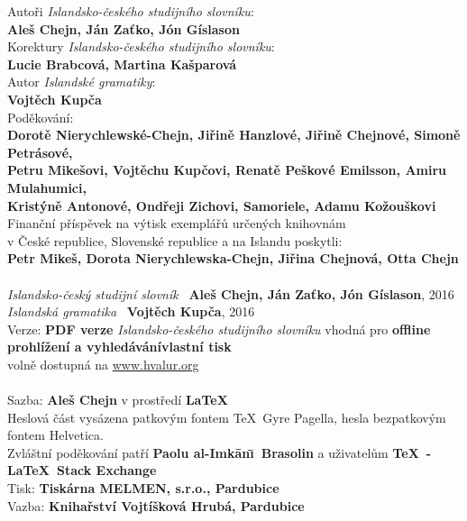 \noindent\begin{minipage}[t][\textheight][t]{\textwidth}
Autoři \textit{Islandsko-českého studijního slovníku}:\\
  \textbf{Aleš Chejn, Ján Zaťko, Jón Gíslason}\\[\baselineskip]
Korektury \textit{Islandsko-českého studijního slovníku}:\\
  \textbf{Lucie Brabcová, Martina Kašparová}\\[\baselineskip]
\ifPDF
\else
Autor \textit{Islandské gramatiky}:\\
  \textbf{Vojtěch Kupča}\\[\baselineskip]
\fi
Poděkování:\\
  \textbf{Dorotě Nierychlewské-Chejn, Jiřině Hanzlové, Jiřině Chejnové,
          Simoně Petrásové,\\ Petru Mikešovi, Vojtěchu Kupčovi, 
          Renatě Peškové Emilsson, Amiru Mulahumici, \\ Kristýně Antonové, 
          Ondřeji Zichovi, Samoriele, Adamu Kožouškovi}\\[\baselineskip]
Finanční příspěvek na výtisk exemplářů určených knihovnám\\ v České republice,
Slovenské republice a na Islandu poskytli:\\
  \textbf{Petr Mikeš, Dorota Nierychlewska-Chejn, Jiřina Chejnová, Otta Chejn}
  \ifPDF
  \\[36\baselineskip]
  \else
  \\[33\baselineskip]
  \fi
\textit{Islandsko-český studijní slovník} \textcopyright\  \textbf{Aleš Chejn, Ján Zaťko, Jón Gíslason}, 2016\\
\textit{Islandská gramatika} \textcopyright\  \textbf{Vojtěch Kupča}, 2016\\[\baselineskip]
\ifPDF
Verze: \textbf{PDF verze} \textit{Islandsko-českého studijního slovníku} vhodná pro \textbf{\ifscreen offline prohlížení a vyhledávání\else vlastní tisk\fi}\\ volně dostupná na \url{www.hvalur.org}\\[\baselineskip]
\else
\textbf\ISBN\\[\baselineskip]
\fi
Sazba: \textbf{Aleš Chejn} v prostředí  \textbf\LaTeX\\
Heslová část vysázena patkovým fontem \TeX\ Gyre Pagella,
hesla bezpatkovým fontem {\phvfamily Helvetica}.\\  
Zvláštní poděkování patří \textbf{Paolu al-Imk\=an\=\i\ Brasolin} a uživatelům  \textbf{\TeX\ - \LaTeX\ Stack Exchange}\\[\baselineskip]
\ifPDF
\else
Tisk: \textbf{Tiskárna MELMEN, s.r.o., Pardubice}\\
Vazba:  \textbf{Knihařství Vojtíšková Hrubá, Pardubice}\\
\fi
\end{minipage}

